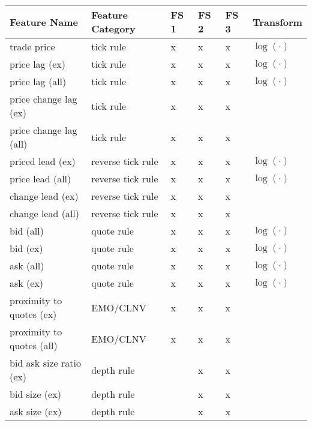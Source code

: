 \begin{tabular}{@{}llllll@{}}
    \toprule
    Feature Name              & Feature Category     & FS 1 & FS 2 & FS 3 & Transform     \\ \midrule
    trade price               & tick rule            & x    & x    & x    & $\log(\cdot)$ \\
    price lag (ex)            & tick rule            & x    & x    & x    & $\log(\cdot)$ \\
    price lag (all)           & tick rule            & x    & x    & x    & $\log(\cdot)$ \\
    price change lag (ex)     & tick rule            & x    & x    & x    &               \\
    price change lag (all)    & tick rule            & x    & x    & x    &               \\
    priced lead (ex)          & reverse tick rule    & x    & x    & x    & $\log(\cdot)$ \\
    price lead (all)          & reverse tick rule    & x    & x    & x    & $\log(\cdot)$ \\
    change lead (ex)          & reverse tick rule    & x    & x    & x    &               \\
    change lead (all)         & reverse tick rule    & x    & x    & x    &               \\
    bid (all)                 & quote rule           & x    & x    & x    & $\log(\cdot)$ \\
    bid (ex)                  & quote rule           & x    & x    & x    & $\log(\cdot)$ \\
    ask (all)                 & quote rule           & x    & x    & x    & $\log(\cdot)$ \\
    ask (ex)                  & quote rule           & x    & x    & x    & $\log(\cdot)$ \\
    proximity to quotes (ex)  & \gls{EMO}/\gls{CLNV} & x    & x    & x    &               \\
    proximity to quotes (all) & \gls{EMO}/\gls{CLNV} & x    & x    & x    &               \\
    bid ask size ratio (ex)   & depth rule           &      & x    & x    &               \\
    bid size (ex)             & depth rule           &      & x    & x    &               \\
    ask size (ex)             & depth rule           &      & x    & x    &               \\

\end{tabular}
